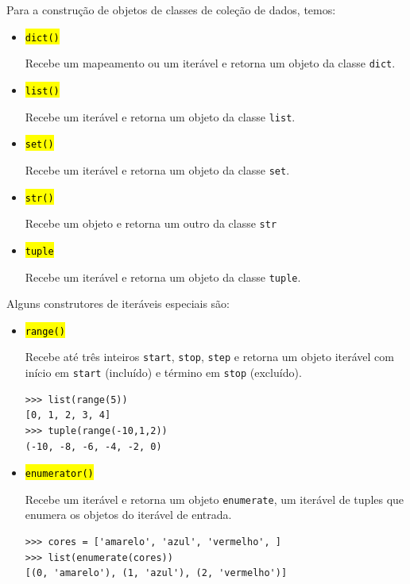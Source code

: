 Para a construção de objetos de classes de coleção de dados, temos:
\begin{itemize}
\item \hl{{\lstinline+dict()+}}

  Recebe um mapeamento ou um iterável e retorna um objeto da classe \lstinline+dict+.

\item \hl{{\lstinline+list()+}}

  Recebe um iterável e retorna um objeto da classe \lstinline+list+.

\item \hl{{\lstinline+set()+}}

  Recebe um iterável e retorna um objeto da classe \lstinline+set+.

\item \hl{{\lstinline+str()+}}

  Recebe um objeto e retorna um outro da classe \lstinline+str+

\item \hl{{\lstinline+tuple+}}

  Recebe um iterável e retorna um objeto da classe \lstinline+tuple+.
\end{itemize}

Alguns construtores de iteráveis especiais são:
\begin{itemize}
\item \hl{{\lstinline+range()+}}

  Recebe até três inteiros \lstinline+start+, \lstinline+stop+, \lstinline+step+ e retorna um objeto iterável com início em \lstinline+start+ (incluído) e término em \lstinline+stop+ (excluído).

\begin{lstlisting}
>>> list(range(5))
[0, 1, 2, 3, 4]
>>> tuple(range(-10,1,2))
(-10, -8, -6, -4, -2, 0)
\end{lstlisting}

\item \hl{{\lstinline+enumerator()+}}

  Recebe um iterável e retorna um objeto \lstinline+enumerate+, um iterável de tuples que enumera os objetos do iterável de entrada.

\begin{lstlisting}
>>> cores = ['amarelo', 'azul', 'vermelho', ]
>>> list(enumerate(cores))
[(0, 'amarelo'), (1, 'azul'), (2, 'vermelho')]
\end{lstlisting}
\end{itemize}

